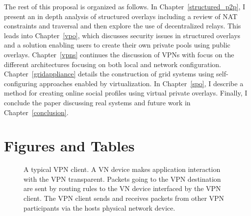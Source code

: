 The rest of this proposal is organized as follows.  In
Chapter~\ref{structured_p2p}, I present an in depth analysis of structured
overlays including a review of NAT constraints and traversal and then explore
the use of decentralized relays.  This leads into Chapter~\ref{vpo}, which
discusses security issues in structured overlays and a solution enabling users
to create their own private pools using public overlays.  Chapter~\ref{vpns}
continues the discussion of VPNs with focus on the different architectures 
focusing on both local and network configuration.  Chapter~\ref{gridappliance}
details the construction of grid systems using self-configuring approaches
enabled by virtualization.  In Chapter~\ref{spo}, I describe a method for
creating online social profiles using virtual private overlays.  Finally, I
conclude the paper discussing real systems and future work in
Chapter~\ref{conclusion}.

\section{Figures and Tables}
\begin{figure}[ht]
\centering
{}
\caption[A typical VPN client]{A typical VPN client.  A VN device makes
application interaction with the VPN transparent.  Packets going to the VPN
destination are sent by routing rules to the VN device interfaced by the VPN
client.  The VPN client sends and receives packets from other VPN participants
via the hosts physical network device.}
\label{fig:vpn}
\end{figure}
